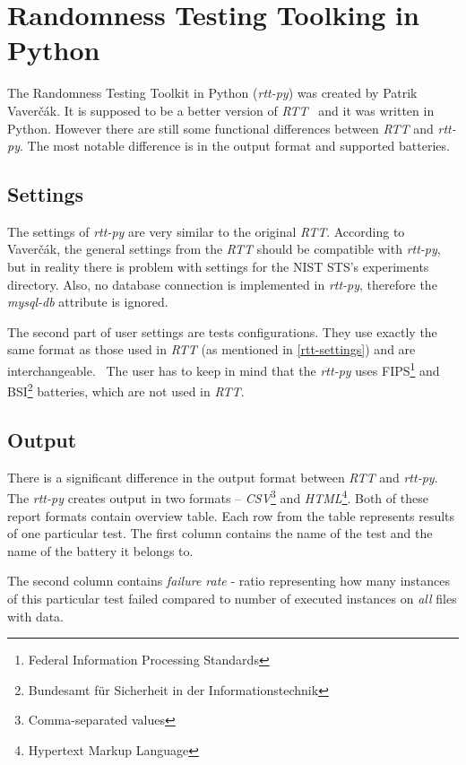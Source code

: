 \documentclass[
  digital,     %
  oneside,     %
  nosansbold,  %
  nocolorbold, %
  nolof,         %
  nolot,         %
]{fithesis4}
\begin{document}
\section{Randomness Testing Toolking in Python}
The Randomness Testing Toolkit in Python (\emph{rtt-py}) was created by Patrik Vaverčák. It is supposed to be a better version of \emph{RTT}~\cite[p.~24]{vavercak} and it was written in Python. However there are still some functional differences between \emph{RTT} and \emph{rtt-py}. The most notable difference is in the output format and supported batteries.

\subsection{Settings}
The settings of \emph{rtt-py} are very similar to the original \emph{RTT}. According to Vaverčák, the general settings from the \emph{RTT} should be compatible with \emph{rtt-py}, but in reality there is problem with settings for the NIST STS's experiments directory. Also, no database connection is implemented in \emph{rtt-py}, therefore the \emph{mysql-db} attribute is ignored. \cite{rtt-py-github}


The second part of user settings are tests configurations. They use exactly the same format as those used in \emph{RTT} (as mentioned in \ref{rtt-settings}) and are interchangeable.~\cite[p.~25]{vavercak} The user has to keep in mind that the \emph{rtt-py} uses FIPS\footnote{Federal Information Processing Standards} and BSI\footnote{Bundesamt für Sicherheit in der Informationstechnik} batteries, which are not used in \emph{RTT}.

\subsection{Output}
There is a significant difference in the output format between \emph{RTT} and \emph{rtt-py}. The \emph{rtt-py} creates output in two formats -- \emph{CSV}\footnote{Comma-separated values} and \emph{HTML}\footnote{Hypertext Markup Language}. Both of these report formats contain overview table. Each row from the table represents results of one particular test. The first column contains the name of the test and the name of the battery it belongs to.

The second column contains \emph{failure rate} - ratio representing how many instances of this particular test failed compared to number of executed instances on \emph{all} files with data.
\end{document}
